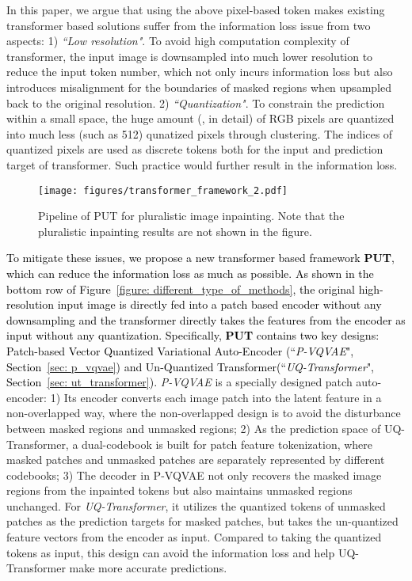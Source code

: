 \documentclass[10pt,twocolumn,letterpaper]{article}
\newcommand{\Fref}[1]{Figure~\ref{#1}}
\newcommand{\Sref}[1]{Section~\ref{#1}}
\newcommand{\qchu}[1]{\textcolor{black}{#1}}
\begin{document}
    
    In this paper, we argue that using the above pixel-based token makes existing transformer based solutions suffer from the information loss issue from two aspects: 1) \emph{``Low resolution"}. To avoid high computation complexity of transformer, the input image is downsampled into much lower resolution to reduce the input token number, which not only incurs information loss but also introduces misalignment for the boundaries of masked regions when upsampled back to the original resolution. 
    2) \emph{``Quantization"}. To constrain the prediction within a small space, the huge amount (, in detail) of RGB pixels are quantized into much less (such as 512) qunatized pixels through clustering. The indices of quantized pixels are used as discrete tokens both for the input and prediction target of transformer. Such practice would further result in the information loss.

 \begin{figure}[t]
	\centering
	\texttt{[image: figures/transformer\_framework\_2.pdf]} 
	\caption{Pipeline of PUT for pluralistic image inpainting. 
	Note that the pluralistic inpainting results are not shown in the figure.
	}
	\vspace{-8pt}
	\label{figure: transformer_framework}
\end{figure}



    \qchu{To mitigate these issues, we propose a new transformer based framework \textbf{PUT}, which can reduce the information loss as much as possible. As shown in the bottom row of \Fref{figure: different_type_of_methods}, the original high-resolution input image is directly fed into a patch based encoder without any downsampling and the transformer directly takes the features from the encoder as input without any quantization. Specifically, \textbf{PUT} contains two key designs: Patch-based Vector Quantized Variational Auto-Encoder (``\textit{P-VQVAE}", \Sref{sec: p_vqvae}) and Un-Quantized Transformer(``\textit{UQ-Transformer}", \Sref{sec: ut_transformer}).} 
    \textit{P-VQVAE} is a specially designed patch auto-encoder: 1) Its encoder converts each image patch into the latent feature in a non-overlapped way, where the non-overlapped design is to avoid the disturbance between masked regions and unmasked regions; 2) As the prediction space of UQ-Transformer, a dual-codebook is built for patch feature tokenization, where masked patches and unmasked patches are separately represented by different codebooks;
    3) The decoder in P-VQVAE not only recovers the masked image regions from the inpainted tokens but also maintains unmasked regions unchanged. For \textit{UQ-Transformer}, it utilizes the quantized tokens of unmasked patches as the prediction targets for masked patches, but takes the un-quantized feature vectors from the encoder as input. Compared to taking the quantized tokens as input, this design can avoid the information loss and help UQ-Transformer make more accurate predictions.
    
\end{document}
